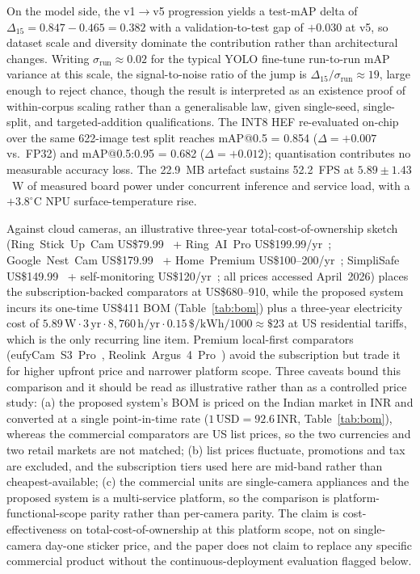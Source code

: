 \documentclass{ieeeaccess}
\begin{document}
On the model side, the v1$\rightarrow$v5 progression yields a test-mAP delta of $\Delta_{15} = 0.847 - 0.465 = 0.382$ with a validation-to-test gap of $+0.030$ at v5, so dataset scale and diversity dominate the contribution rather than architectural changes. Writing $\sigma_{\text{run}} \approx 0.02$ for the typical YOLO fine-tune run-to-run mAP variance at this scale, the signal-to-noise ratio of the jump is $\Delta_{15} / \sigma_{\text{run}} \approx 19$, large enough to reject chance, though the result is interpreted as an existence proof of within-corpus scaling rather than a generalisable law, given single-seed, single-split, and targeted-addition qualifications. The INT8 HEF re-evaluated on-chip over the same 622-image test split reaches mAP{@}0.5 = 0.854 ($\Delta = +0.007$ vs.\ FP32) and mAP{@}0.5:0.95 = 0.682 ($\Delta = +0.012$); quantisation contributes no measurable accuracy loss. The 22.9~MB artefact sustains 52.2~FPS at $5.89 \pm 1.43$~W of measured board power under concurrent inference and service load, with a $+3.8^\circ$C NPU surface-temperature rise.

Against cloud cameras, an illustrative three-year total-cost-of-ownership sketch (Ring~Stick~Up~Cam US\$79.99~\cite{b33} + Ring~AI~Pro US\$199.99/yr~\cite{b34}; Google~Nest~Cam US\$179.99~\cite{b35} + Home~Premium US\$100--200/yr~\cite{b36}; SimpliSafe US\$149.99~\cite{b37} + self-monitoring US\$120/yr~\cite{b38}; all prices accessed April~2026) places the subscription-backed comparators at US\$680--910, while the proposed system incurs its one-time US\$411 BOM (Table~\ref{tab:bom}) plus a three-year electricity cost of $5.89\,\mathrm{W} \cdot 3\,\mathrm{yr} \cdot 8{,}760\,\mathrm{h/yr} \cdot 0.15\,\$\mathrm{/kWh} / 1000 \approx \$23$ at US residential tariffs, which is the only recurring line item. Premium local-first comparators (eufyCam~S3~Pro~\cite{b39}, Reolink~Argus~4~Pro~\cite{b40}) avoid the subscription but trade it for higher upfront price and narrower platform scope. Three caveats bound this comparison and it should be read as illustrative rather than as a controlled price study: (a) the proposed system's BOM is priced on the Indian market in INR and converted at a single point-in-time rate ($1\,\text{USD}=92.6\,\text{INR}$, Table~\ref{tab:bom}), whereas the commercial comparators are US list prices, so the two currencies and two retail markets are not matched; (b) list prices fluctuate, promotions and tax are excluded, and the subscription tiers used here are mid-band rather than cheapest-available; (c) the commercial units are single-camera appliances and the proposed system is a multi-service platform, so the comparison is platform-functional-scope parity rather than per-camera parity. The claim is cost-effectiveness on total-cost-of-ownership at this platform scope, not on single-camera day-one sticker price, and the paper does not claim to replace any specific commercial product without the continuous-deployment evaluation flagged below.
\end{document}
